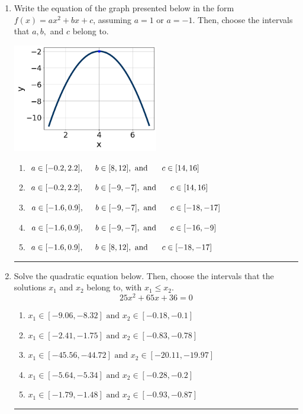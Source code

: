 \documentclass[14pt]{extbook}
\newcommand{\litem}[1]{\item#1\hspace*{-1cm}\rule{\textwidth}{0.4pt}}
\begin{document}
\begin{enumerate}
{\begin{enumerate}[label=\Alph*.]
\end{enumerate} }
\litem{
Write the equation of the graph presented below in the form $f(x)=ax^2+bx+c$, assuming  $a=1$ or $a=-1$. Then, choose the intervals that $a, b,$ and $c$ belong to.
\begin{center}
    \includegraphics[width=0.5\textwidth]{../Figures/quadraticGraphToEquationA.png}
\end{center}
\begin{enumerate}[label=\Alph*.]
\item \( a \in [-0.2, 2.2], \hspace*{5mm} b \in [8, 12], \text{ and } \hspace*{5mm} c \in [14, 16] \)
\item \( a \in [-0.2, 2.2], \hspace*{5mm} b \in [-9, -7], \text{ and } \hspace*{5mm} c \in [14, 16] \)
\item \( a \in [-1.6, 0.9], \hspace*{5mm} b \in [-9, -7], \text{ and } \hspace*{5mm} c \in [-18, -17] \)
\item \( a \in [-1.6, 0.9], \hspace*{5mm} b \in [-9, -7], \text{ and } \hspace*{5mm} c \in [-16, -9] \)
\item \( a \in [-1.6, 0.9], \hspace*{5mm} b \in [8, 12], \text{ and } \hspace*{5mm} c \in [-18, -17] \)

\end{enumerate} }
\litem{
Solve the quadratic equation below. Then, choose the intervals that the solutions $x_1$ and $x_2$ belong to, with $x_1 \leq x_2$.\[ 25x^{2} +65 x + 36 = 0 \]\begin{enumerate}[label=\Alph*.]
\item \( x_1 \in [-9.06, -8.32] \text{ and } x_2 \in [-0.18, -0.1] \)
\item \( x_1 \in [-2.41, -1.75] \text{ and } x_2 \in [-0.83, -0.78] \)
\item \( x_1 \in [-45.56, -44.72] \text{ and } x_2 \in [-20.11, -19.97] \)
\item \( x_1 \in [-5.64, -5.34] \text{ and } x_2 \in [-0.28, -0.2] \)
\item \( x_1 \in [-1.79, -1.48] \text{ and } x_2 \in [-0.93, -0.87] \)


\end{enumerate}}
\end{enumerate}
\end{document}
